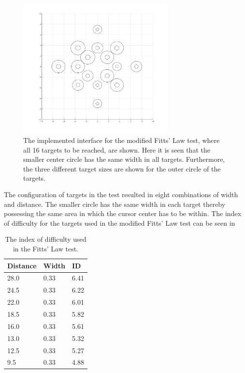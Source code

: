 \begin{figure}[H] 
	\includegraphics[width=0.7\textwidth]{figures/pMethods/DotsToReach}
	\caption{The implemented interface for the modified Fitts' Law test, where all 16 targets to be reached, are shown. Here it is seen that the smaller center circle has the same width in all targets. Furthermore, the three different target sizes are shown for the outer circle of the targets.}
	\label{fig:alltargets}
\end{figure}

The configuration of targets in the test resulted in eight combinations of width and distance. The smaller circle has the same width in each target thereby possessing the same area in which the cursor center has to be within. The index of difficulty for the targets used in the modified Fitts' Law test can be seen in 

\begin{table}[H]
	\centering
	\caption{The index of difficulty used in the Fitts' Law test.}
	\label{tab:P:ID}
	\begin{tabular}{lll}
		
		Distance		 & Width	         & ID				   \\ \hline \hline
		28.0     & 0.33 & 6.41                \\ %
		24.5     & 0.33 & 6.22                \\ %
		22.0     & 0.33 & 6.01                \\ %
		18.5     & 0.33 & 5.82                \\ %
		16.0     & 0.33 & 5.61                \\ %
		13.0     & 0.33 & 5.32                \\ %
		12.5     & 0.33 & 5.27                \\ %
		9.5      & 0.33 & 4.88                \\ \hline \hline
	\end{tabular}
\end{table}



